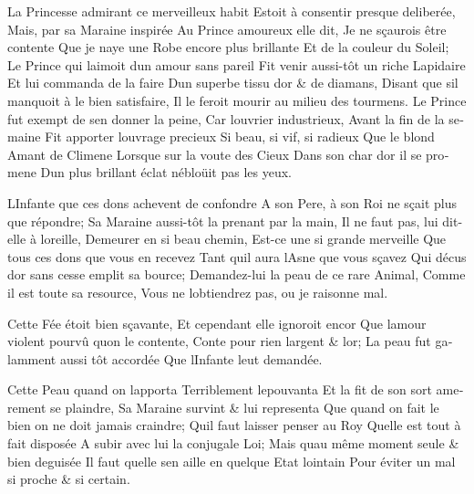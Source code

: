 \documentclass[14pt,a4paper]{memoir}
\begin{document}
\begin{otherlanguage}{french}
{La Princesse admirant ce merveilleux habit} {Estoit à consentir presque
deliberée,} {Mais, par sa Maraine inspirée} {Au Prince amoureux elle
dit,} {Je ne sçaurois être contente} {Que je n\textquotesingle aye une
Robe encore plus brillante} {Et de la couleur du Soleil;} {Le Prince qui
l\textquotesingle aimoit d\textquotesingle un amour sans pareil} {Fit
venir aussi-tôt un riche Lapidaire} {Et lui commanda de la faire}
{D\textquotesingle un superbe tissu d\textquotesingle or \& de diamans,}
{Disant que s\textquotesingle il manquoit à le bien satisfaire,} {Il le
feroit mourir au milieu des tourmens.} {Le Prince fut exempt de
s\textquotesingle en donner la peine,} {Car l\textquotesingle ouvrier
industrieux,} {Avant la fin de la semaine} {Fit apporter
l\textquotesingle ouvrage precieux} {Si beau, si vif, si radieux} {Que
le blond Amant de Climene} {Lorsque sur la voute des Cieux} {Dans son
char d\textquotesingle or il se promene} {D\textquotesingle un plus
brillant éclat n\textquotesingle ébloüit pas les yeux. }

{L\textquotesingle Infante que ces dons achevent de confondre} {A son
Pere, à son Roi ne sçait plus que répondre; } {Sa Maraine aussi-tôt la
prenant par la main,} {Il ne faut pas, lui dit-elle à
l\textquotesingle oreille,} {Demeurer en si beau chemin,} {Est-ce une si
grande merveille} {Que tous ces dons que vous en recevez} {Tant
qu\textquotesingle il aura l\textquotesingle Asne que vous sçavez} {Qui
d\textquotesingle écus d\textquotesingle or sans cesse emplit sa
bource;} {Demandez-lui la peau de ce rare Animal,} {Comme il est toute
sa resource,} {Vous ne l\textquotesingle obtiendrez pas, ou je raisonne
mal.}

{Cette Fée étoit bien sçavante,} {Et cependant elle ignoroit encor} {Que
l\textquotesingle amour violent pourvû qu\textquotesingle on le
contente,} {Conte pour rien l\textquotesingle argent \&
l\textquotesingle or;} {La peau fut galamment aussi tôt accordée} {Que
l\textquotesingle Infante l\textquotesingle eut demandée.}

{Cette Peau quand on l\textquotesingle apporta} {Terriblement
l\textquotesingle epouvanta} {Et la fit de son sort amerement se
plaindre,} {Sa Maraine survint \& lui representa} {Que quand on fait le
bien on ne doit jamais craindre;} {Qu\textquotesingle il faut laisser
penser au Roy} {Qu\textquotesingle elle est tout à fait disposée} {A
subir avec lui la conjugale Loi;} {Mais qu\textquotesingle au même
moment seule \& bien deguisée } {Il faut qu\textquotesingle elle
s\textquotesingle en aille en quelque Etat lointain} {Pour éviter un mal
si proche \& si certain.}


\end{otherlanguage}
\end{document}
